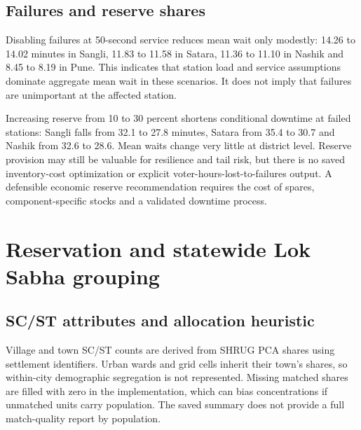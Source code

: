 \documentclass[11pt,a4paper,oneside]{report}
\newcommand{\source}[1]{\par\nopagebreak[4]{\footnotesize\color{teal}Evidence: #1.}\par}
\begin{document}
\section{Failures and reserve shares}
Disabling failures at 50-second service reduces mean wait only modestly: 14.26 to 14.02 minutes in Sangli, 11.83 to 11.58 in Satara, 11.36 to 11.10 in Nashik and 8.45 to 8.19 in Pune. This indicates that station load and service assumptions dominate aggregate mean wait in these scenarios. It does not imply that failures are unimportant at the affected station.

Increasing reserve from 10 to 30 percent shortens conditional downtime at failed stations: Sangli falls from 32.1 to 27.8 minutes, Satara from 35.4 to 30.7 and Nashik from 32.6 to 28.6. Mean waits change very little at district level. Reserve provision may still be valuable for resilience and tail risk, but there is no saved inventory-cost optimization or explicit voter-hours-lost-to-failures output. A defensible economic reserve recommendation requires the cost of spares, component-specific stocks and a validated downtime process.
\source{[S11]}

\chapter{Reservation and statewide Lok Sabha grouping}
\section{SC/ST attributes and allocation heuristic}
Village and town SC/ST counts are derived from SHRUG PCA shares using settlement identifiers. Urban wards and grid cells inherit their town's shares, so within-city demographic segregation is not represented. Missing matched shares are filled with zero in the implementation, which can bias concentrations if unmatched units carry population. The saved summary does not provide a full match-quality report by population.
\end{document}
